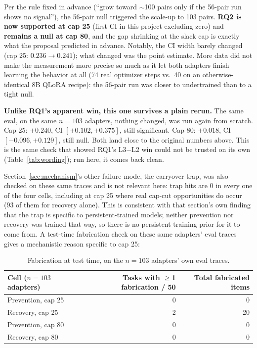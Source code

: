 \documentclass[11pt,a4paper]{article}
\newcommand{\cell}[1]{\textbf{#1}}
\begin{document}
Per the rule fixed in advance (``grow toward $\sim$100 pairs only if the 56-pair run
shows no signal''), the 56-pair null triggered the scale-up to 103 pairs. \textbf{RQ2 is now
supported at cap 25} (first CI in this project excluding zero) and \textbf{remains a null at cap
80}, and the gap shrinking at the slack cap is exactly what the proposal predicted in advance.
Notably, the CI width barely changed (cap 25: $0.236\to0.241$); what changed was the point
estimate. More data did not make the measurement more precise so much as it let both adapters
finish learning the behavior at all (74 real optimizer steps vs.\ 40 on an otherwise-identical
8B QLoRA recipe): the 56-pair run was closer to undertrained than to a tight null.

\textbf{Unlike RQ1's apparent win, this one survives a plain rerun.} The same eval, on the same
$n=103$ adapters, nothing changed, was run again from scratch. Cap 25: $+0.240$, CI
$[+0.102,+0.375]$, still significant. Cap 80: $+0.018$, CI $[-0.096,+0.129]$, still null. Both
land close to the original numbers above. This is the same check that showed RQ1's L3$-$L2 win
could not be trusted on its own (Table~\ref{tab:wording}); run here, it comes back clean.

Section~\ref{sec:mechanism}'s other failure mode, the carryover trap, was also checked on these
same traces and is not relevant here: trap hits are 0 in every one of the four cells, including
at cap 25 where real cap-cut opportunities do occur (93 of them for recovery alone). This is
consistent with that section's own finding that the trap is specific to persistent-trained
models; neither prevention nor recovery was trained that way, so there is no persistent-training
prior for it to come from. A test-time fabrication check on these same adapters' eval traces
gives a mechanistic reason specific to cap 25:

\begin{table}[H]
\centering
\small
\begin{tabular}{@{}lrr@{}}
\toprule
\cell{Cell ($n=103$ adapters)} & \cell{Tasks with $\geq$1 fabrication / 50} & \cell{Total fabricated items} \\
\midrule
Prevention, cap 25 & 0 & 0 \\
Recovery, cap 25   & 2 & 20 \\
Prevention, cap 80 & 0 & 0 \\
Recovery, cap 80   & 0 & 0 \\
\bottomrule
\end{tabular}
\caption{Fabrication at test time, on the $n=103$ adapters' own eval traces.}
\label{tab:rq2-fab}
\end{table}
\end{document}
